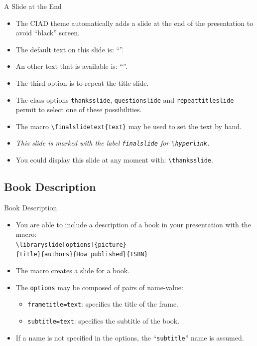 \documentclass[english,sectioncirclenumberstyle]{ciadbeamer}
\begin{document}
\begin{frame}{{A Slide} at the End}
	\begin{itemize}
	\item The CIAD theme automatically adds a slide at the end of the presentation to avoid ``black'' screen.
	\vfill
	\item The default text on this slide is: ``''.
	\item An other text that is available is: ``''.
	\item The third option is to repeat the title slide.
	\vfill
	\item The class options \texttt{thanksslide}, \texttt{questionslide} and \texttt{repeattitleslide} permit to select one of these possibilities.
	\vfill
	\item The macro \texttt{{\textbackslash}finalslidetext\{text\}} may be used to set the text by hand.
	\vfill
	\item \emph{This slide is marked with the label \texttt{finalslide} for \texttt{{\textbackslash}hyperlink}.}
	\vfill
	\item You could display this slide at any moment with: \texttt{{\textbackslash}thanksslide}.
	\end{itemize}
\end{frame}

\subsection{Book Description}

\begin{frame}{Book Description}
	\begin{itemize}
	\item You are able to include a description of a book in your presentation with the macro: \\
		\texttt{{\textbackslash}libraryslide[options]\{picture\}} \\
		\texttt{\{title\}\{authors\}\{How published\}\{ISBN\}}
	\vspace{1em}
	\item The macro creates a slide for a book.
	\vspace{1em}
	\item The \texttt{options} may be composed of pairs of name-value:
		\begin{itemize}
		\item \texttt{frametitle=text}: specifies the title of the frame.
		\item \texttt{subtitle=text}: specifies the subtitle of the book.
		\end{itemize}
	\item If a name is not specified in the options, the ``\texttt{subtitle}'' name is assumed.
	\end{itemize}
\end{frame}
\end{document}
